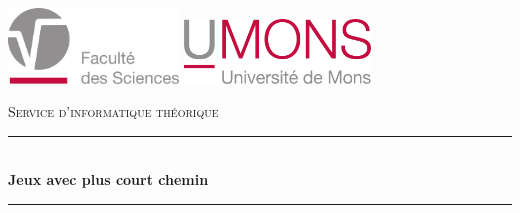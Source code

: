 \documentclass[12pt,a4paper]{report}
\theoremstyle{definition}%
\theoremstyle{remark}
\begin{document}
\begin{titlepage}
	
	\newcommand{\HRule}{\rule{\linewidth}{0.5mm}} %
	
	\center %
	

	\begin{center}
	\includegraphics[height=2cm]{logos/UMONS_FS.pdf}
	\hspace{5cm}
	\includegraphics[height=1.7cm]{logos/UMONS+txt}
	\\[1em]
	\vspace{1cm}
	\end{center}
	\textsc{\large Service d'informatique théorique }\\[0.5cm] %
	
	
	\vspace{0.5cm}
	\HRule \\[0.4cm]
	{ \huge \bfseries Jeux avec plus court chemin}\\[0.4cm] %
	\HRule \\[1.5cm]
	

\end{titlepage}
\end{document}
